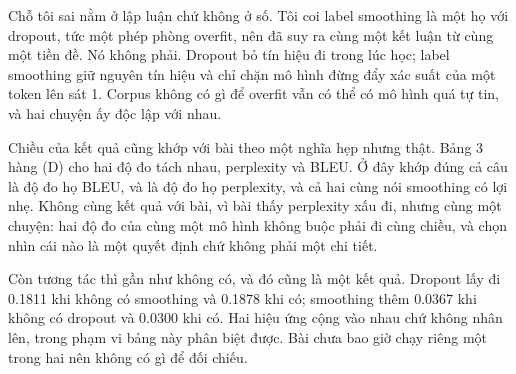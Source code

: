 Chỗ tôi sai nằm ở lập luận chứ không ở số. Tôi coi label smoothing là một họ với
dropout, tức một phép phòng overfit, nên đã suy ra cùng một kết luận từ cùng một
tiền đề. Nó không phải. Dropout bỏ tín hiệu đi trong lúc học; label smoothing
giữ nguyên tín hiệu và chỉ chặn mô hình đừng đẩy xác suất của một token lên sát
1. Corpus không có gì để overfit vẫn có thể có mô hình quá tự tin, và hai chuyện
ấy độc lập với nhau.

Chiều của kết quả cũng khớp với bài theo một nghĩa hẹp nhưng thật. Bảng 3 hàng
(D) cho hai độ đo tách nhau, perplexity và BLEU. Ở đây khớp đúng cả câu là độ đo
họ BLEU, và  là độ đo họ perplexity, và cả hai cùng nói smoothing
có lợi nhẹ. Không cùng kết quả với bài, vì bài thấy perplexity xấu đi, nhưng
cùng một chuyện: hai độ đo của cùng một mô hình không buộc phải đi cùng chiều,
và chọn nhìn cái nào là một quyết định chứ không phải một chi tiết.

%
Còn tương tác thì gần như không có, và đó cũng là một kết quả. Dropout lấy đi
0.1811 khi không có smoothing và 0.1878 khi có; smoothing thêm 0.0367 khi không
có dropout và 0.0300 khi có. Hai hiệu ứng cộng vào nhau chứ không nhân lên,
trong phạm vi bảng này phân biệt được. Bài chưa bao giờ chạy riêng một trong hai
nên không có gì để đối chiếu.
